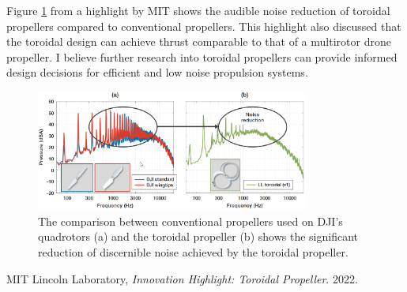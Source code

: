 \documentclass[a2,portrait]{a0poster}
\begin{document}
\begin{minipage}[t][0pt]{0.97\linewidth}
\begin{multicols}{2}
Figure \ref{fig:noise} from a highlight by MIT \cite{MIT_toroidal} shows the audible noise reduction of toroidal propellers compared to conventional propellers.
This highlight also discussed that the toroidal design can achieve thrust comparable to that of a multirotor drone propeller.
I believe further research into toroidal propellers can provide informed design decisions for efficient and low noise propulsion systems.


\end{multicols}

\begin{figure}[H]
    \centering
    \includegraphics[width=0.8\textwidth]{noise.png}
    \caption{The comparison between conventional propellers used on DJI's quadrotors (a) and the toroidal propeller (b)
    shows the significant reduction of discernible noise achieved by the toroidal propeller. \cite{MIT_toroidal}}
    \label{fig:noise}
\end{figure}



\color{Black} 

\begin{thebibliography}{9}

      MIT Lincoln Laboratory,
      \emph{Innovation Highlight: Toroidal Propeller}.
      2022.
    
\end{thebibliography}

\end{minipage}
\end{document}
